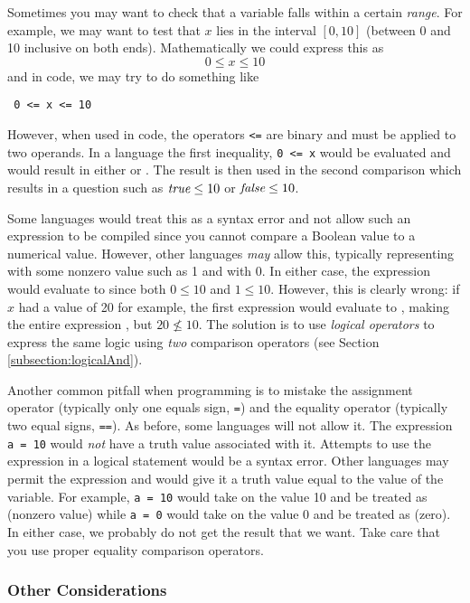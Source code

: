 Sometimes you may want to check that a variable falls within a certain \emph{range}.  For
example, we may want to test that $x$ lies in the interval $[0, 10]$ (between
0 and 10 inclusive on both ends).  Mathematically we could express this as
  $$0 \leq x \leq 10$$
and in code, we may try to do something like

\texttt{  0 <= x <= 10}

However, when used in code, the operators \texttt{<=} are binary and must be
applied to two operands.  In a language the first inequality, \texttt{0 <= x} 
would be evaluated and would result in either \True or \False.  The result is then
used in the second comparison which results in a question such as $\emph{true} \leq 10$
or $\emph{false} \leq 10$.

Some languages would treat this as a syntax error and not allow such an expression
to be compiled since you cannot compare a Boolean value to a numerical value.
However, other languages \emph{may} allow this, typically representing \True
with some nonzero value such as 1 and \False with 0.  In either case, the
expression would evaluate to \True since both $0 \leq 10$ and $1 \leq 10$.  
However, this is clearly wrong: if $x$ had a value of 20 for example, the first
expression would evaluate to \False, making the entire expression \True, but
$20 \not\leq 10$.  The solution is to use \emph{logical operators} to express
the same logic using \emph{two} comparison operators (see Section \ref{subsection:logicalAnd}).

Another common pitfall when programming is to mistake the assignment 
operator (typically only one equals sign, \texttt{=}) and the equality operator
(typically two equal signs, \texttt{==}).  As before, some languages will not
allow it.  The expression \texttt{a = 10} would \emph{not} have a truth value
associated with it.  Attempts to use the expression in a logical statement would
be a syntax error.  Other languages may permit the expression and would
give it a truth value equal to the value of the variable.  For example, \texttt{a = 10}
would take on the value 10 and be treated as \True (nonzero value) while 
\texttt{a = 0} would take on the value 0 and be treated as \False (zero).
In either case, we probably do not get the result that we want.  Take care that you
use proper equality comparison operators.  

\subsubsection{Other Considerations}

